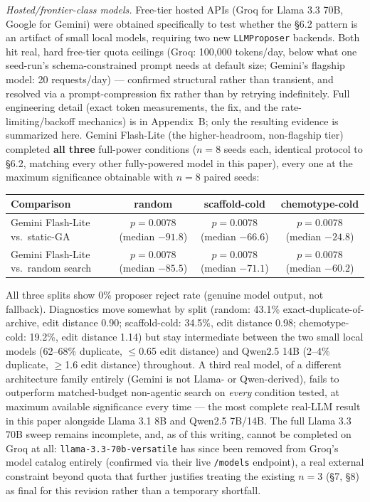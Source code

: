 \documentclass{article}
\begin{document}
\emph{Hosted/frontier-class models.} Free-tier hosted APIs (Groq for
Llama 3.3 70B, Google for Gemini) were obtained specifically to test
whether the \S6.2 pattern is an artifact of small local models, requiring
two new \texttt{LLMProposer} backends. Both hit real, hard free-tier
quota ceilings (Groq: 100,000 tokens/day, below what one seed-run's
schema-constrained prompt needs at default size; Gemini's flagship model:
20 requests/day) --- confirmed structural rather than transient, and
resolved via a prompt-compression fix rather than by retrying
indefinitely. Full engineering detail (exact token measurements, the fix,
and the rate-limiting/backoff mechanics) is in Appendix~B; only the
resulting evidence is summarized here. Gemini Flash-Lite (the
higher-headroom, non-flagship tier) completed \textbf{all three} full-power
conditions ($n=8$ seeds each, identical protocol to \S6.2, matching every
other fully-powered model in this paper), every one at the maximum
significance obtainable with $n=8$ paired seeds:

\begin{center}
\begin{tabular}{lccc}
\toprule
Comparison & random & scaffold-cold & chemotype-cold \\
\midrule
Gemini Flash-Lite vs.\ static-GA & $p=0.0078$ (median $-91.8$) & $p=0.0078$ (median $-66.6$) & $p=0.0078$ (median $-24.8$) \\
Gemini Flash-Lite vs.\ random search & $p=0.0078$ (median $-85.5$) & $p=0.0078$ (median $-71.1$) & $p=0.0078$ (median $-60.2$) \\
\bottomrule
\end{tabular}
\end{center}

All three splits show 0\% proposer reject rate (genuine model output, not
fallback). Diagnostics move somewhat by split (random: 43.1\%
exact-duplicate-of-archive, edit distance 0.90; scaffold-cold: 34.5\%,
edit distance 0.98; chemotype-cold: 19.2\%, edit distance 1.14) but stay
intermediate between the two small local models (62--68\% duplicate,
$\le$0.65 edit distance) and Qwen2.5 14B (2--4\% duplicate, $\ge$1.6 edit
distance) throughout. A third real model, of a different architecture
family entirely (Gemini is not Llama- or Qwen-derived), fails to
outperform matched-budget non-agentic search on \emph{every} condition
tested, at maximum available significance every time --- the most
complete real-LLM result in this paper alongside Llama 3.1 8B and Qwen2.5
7B/14B. The full Llama 3.3 70B sweep remains incomplete, and, as of this
writing, cannot be completed on Groq at all: \texttt{llama-3.3-70b-versatile}
has since been removed from Groq's model catalog entirely (confirmed via
their live \texttt{/models} endpoint), a real external constraint beyond
quota that further justifies treating the existing $n=3$ (\S7, \S8) as
final for this revision rather than a temporary shortfall.
\end{document}
